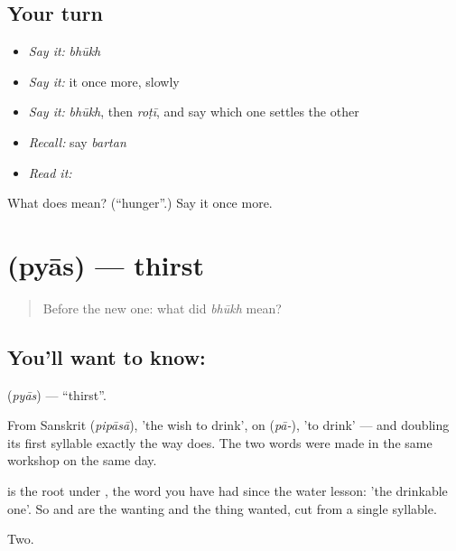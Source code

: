 \subsection*{Your turn}
\begin{itemize}
\raggedright
  \item \emph{Say it:} \emph{bhūkh}
  \item \emph{Say it:} it once more, slowly
  \item \emph{Say it:} \emph{bhūkh}, then \emph{roṭī}, and say which one settles the other
  \item \emph{Recall:} say \emph{bartan}
  \item \emph{Read it:} \textbf{}
\end{itemize}

\begin{tcolorbox}[breakable,colback=teal!4,colframe=teal!35!black,title={Before you move on}]
What does  mean? (\textquotedblleft{}hunger\textquotedblright{}.) Say it once more.
\end{tcolorbox}
\section[\texorpdfstring{\hi{प्यास} (pyās)}{प्यास (pyās)}]{ (pyās) — thirst}

\label{lesson:HI-C63-thirst}



\begin{quote}
Before the new one: what did \emph{bhūkh} mean?
\end{quote}

\subsection*{You'll want to know: }
\textbf{} (\emph{pyās}) — \textquotedblleft{}thirst\textquotedblright{}.

From Sanskrit  (\emph{pipāsā}), 'the wish to drink', on  (\emph{pā-}), 'to drink' — and doubling its first syllable exactly the way  does. The two words were made in the same workshop on the same day.

 is the root under , the word you have had since the water lesson: 'the drinkable one'. So  and  are the wanting and the thing wanted, cut from a single syllable.

\begin{grammarlens}[title={What you've built}]
Two.
\end{grammarlens}

